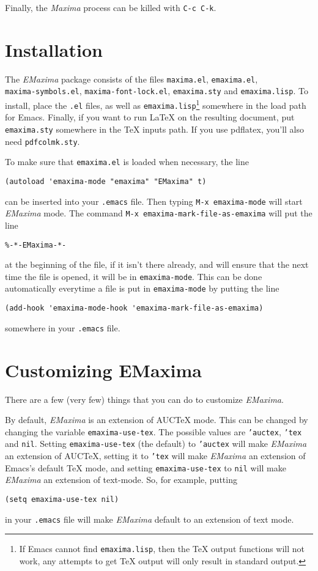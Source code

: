 \documentclass{article}
\newcommand{\emx}{\textsl{\sffamily EMaxima}}
\newcommand{\mx}{\textsl{\sffamily Maxima}}
\begin{document}
Finally, the \mx{} process can be killed with \texttt{C-c C-k}.

\newpage
\appendix

\section{Installation}

\noindent
The \emx{} package consists of the files \texttt{maxima.el},
\texttt{emaxima.el},\\
\texttt{maxima-symbols.el},
\texttt{maxima-font-lock.el}, \texttt{emaxima.sty} and \texttt{emaxima.lisp}.
To install, place the \texttt{.el} files, as well as
\texttt{emaxima.lisp}\footnote{If Emacs cannot find
  \texttt{emaxima.lisp}, then the \TeX{} output functions will not
  work, any attempts to get \TeX{} output will only result in standard
  output.} 
somewhere in the load path for Emacs.
Finally, if you want to run \LaTeX{} on the resulting document, put
\texttt{emaxima.sty} somewhere in the \TeX{} inputs path.  If you use
pdflatex, you'll also need \texttt{pdfcolmk.sty}.

To make sure that \texttt{emaxima.el} is loaded when necessary, the line
\begin{verbatim}
(autoload 'emaxima-mode "emaxima" "EMaxima" t)
\end{verbatim}
\noindent
can be inserted into your \texttt{.emacs} file.  Then typing
\texttt{M-x emaxima-mode} will start \emx{} mode.  The command 
\texttt{M-x emaxima-mark-file-as-emaxima} will put the line
\begin{verbatim}
%-*-EMaxima-*-
\end{verbatim}
\noindent
at the beginning of the file, if it isn't there already, and will ensure
that the next time the file is opened, it will be in \texttt{emaxima-mode}.  
This can be done automatically everytime a file is put in
\texttt{emaxima-mode} by putting the line
\begin{verbatim}
(add-hook 'emaxima-mode-hook 'emaxima-mark-file-as-emaxima)
\end{verbatim}
\noindent
somewhere in your \texttt{.emacs} file.

\section{Customizing EMaxima}

\noindent
There are a few (very few) things that you can do to customize \emx{}.  

By default, \emx{} is an extension of AUC\TeX{} mode.  This can be
changed by changing the variable \texttt{emaxima-use-tex}.  The possible
values are \texttt{'auctex}, \texttt{'tex} and \texttt{nil}.  Setting
\texttt{emaxima-use-tex} (the default) to \texttt{'auctex} will make \emx{}
an extension of AUC\TeX{}, setting it to \texttt{'tex} will make \emx{} an
extension of Emacs's default \TeX{} mode, and setting
\texttt{emaxima-use-tex} to \texttt{nil} will make \emx{} an extension of
text-mode.  So, for example, putting 
\begin{verbatim}
(setq emaxima-use-tex nil)
\end{verbatim}
\noindent
in your \texttt{.emacs} file will make \emx{} default to an extension of
text mode. 
\end{document}

